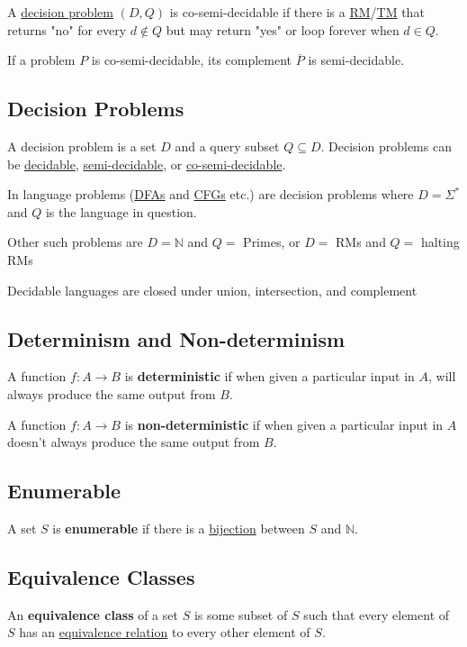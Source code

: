 \documentclass{article}
\begin{document}
A \hyperref[decision problem]{decision problem} $(D, Q)$ is co-semi-decidable if there is a \hyperref[rm]{RM}/\hyperref[tm]{TM} that returns "no" for every $d \not \in Q$ but may return "yes" or loop forever when $d \in Q$.

If a problem $P$ is co-semi-decidable, its complement $\overline P$ is semi-decidable.


\subsection{Decision Problems}\label{decision-problem}
A decision problem is a set $D$ and a query subset $Q \subseteq D$. Decision problems can be \hyperref[decidable]{decidable}, \hyperref[semi-decidable]{semi-decidable}, or \hyperref[co-semi-decidable]{co-semi-decidable}.

In language problems (\hyperref[dfa]{DFAs} and \hyperref[cfg]{CFGs} etc.) are decision problems where $D = \Sigma^*$ and $Q$ is the language in question.

Other such problems are $D = \mathbb{N}$ and $Q =$ Primes, or $D=$ RMs and $Q =$ halting RMs

Decidable languages are closed under union, intersection, and complement


\subsection{Determinism and Non-determinism}\label{deterministic}
A function $f : A \to B$ is \textbf{deterministic} if when given a particular input in $A$, will always produce the same output from $B$.

A function $f : A \to B$ is \textbf{non-deterministic} if when given a particular input in $A$ doesn't always produce the same output from $B$.


\subsection{Enumerable}\label{enumerable}
A set $S$ is \textbf{enumerable} if there is a \hyperref[bijection]{bijection} between $S$ and $\mathbb{N}$.


\subsection{Equivalence Classes}\label{equivalence-class}
An \textbf{equivalence class} of a set $S$ is some subset of $S$ such that every element of $S$ has an \hyperref[equivalence-relation]{equivalence relation} to every other element of $S$.
\end{document}
